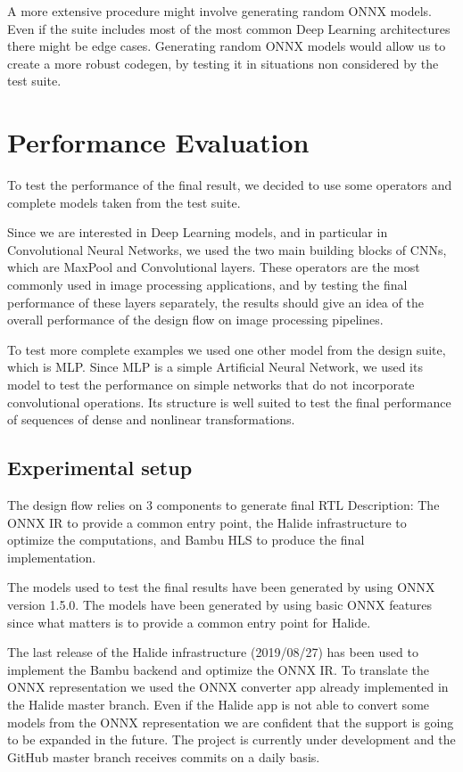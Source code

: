 \documentclass[../main.tex]{subfiles}
\begin{document}
A more extensive procedure might involve generating random ONNX models.
Even if the suite includes most of the most common Deep Learning architectures there might be edge cases.
Generating random ONNX models would allow us to create a more robust codegen, by testing it in situations non considered by the test suite.

\section{Performance Evaluation}
\label {performance}

To test the performance of the final result, we decided to use some operators and complete models taken from the test suite.

Since we are interested in Deep Learning models, and in particular in  Convolutional Neural Networks, we used the two main building blocks of CNNs, which are MaxPool and Convolutional layers.
These operators are the most commonly used in image processing applications, and by testing the final performance of these layers separately, the results should give an idea of the overall performance of the design flow on image processing pipelines.

To test more complete examples we used one other model from the design suite, which is MLP.
Since MLP is a simple Artificial Neural Network, we used its model to test the performance on simple networks that do not incorporate convolutional operations.
Its structure is well suited to test the final performance of sequences of dense and nonlinear transformations.

\subsection{Experimental setup}

The design flow relies on 3 components to generate final  RTL Description: The ONNX IR to provide a common entry point, the Halide infrastructure to optimize the computations, and Bambu HLS to produce the final implementation.

The models used to test the final results have been generated by using ONNX version 1.5.0.
The models have been generated by using basic ONNX features since what matters is to provide a common entry point for Halide.

The last release of the Halide infrastructure (2019/08/27) has been used to implement the Bambu backend and optimize the ONNX IR.
To translate the ONNX representation we used the ONNX converter app already implemented in the Halide master branch.
Even if the Halide app is not able to convert some models from the ONNX representation we are confident that the support is going to be expanded in the future.
The project is currently under development and the GitHub master branch receives commits on a daily basis.
\end{document}
